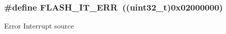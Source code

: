 \subsubsection[{\texorpdfstring{F\+L\+A\+S\+H\+\_\+\+I\+T\+\_\+\+E\+RR}{FLASH_IT_ERR}}]{\setlength{\rightskip}{0pt plus 5cm}\#define F\+L\+A\+S\+H\+\_\+\+I\+T\+\_\+\+E\+RR~((uint32\+\_\+t)0x02000000)}\hypertarget{group___f_l_a_s_h___interrupt__definition_ga4e2c23ab8c1b9a5ee49bf6d695d9ae8c}{}\label{group___f_l_a_s_h___interrupt__definition_ga4e2c23ab8c1b9a5ee49bf6d695d9ae8c}
Error Interrupt source 